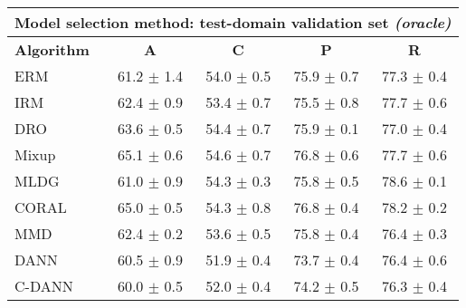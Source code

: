\documentclass{article}
\begin{document}
\begin{center}
\begin{tabular}{lcccc}
\toprule
\multicolumn{5}{c}{\textbf{Model selection method: test-domain validation set \textit{(oracle)}}} \\
\midrule
\textbf{Algorithm}    & \textbf{A}                & \textbf{C}                & \textbf{P}                & \textbf{R}                \\
\midrule
ERM                       & 61.2 $\pm$ 1.4            & 54.0 $\pm$ 0.5            & 75.9 $\pm$ 0.7            & 77.3 $\pm$ 0.4            \\
IRM                       & 62.4 $\pm$ 0.9            & 53.4 $\pm$ 0.7            & 75.5 $\pm$ 0.8            & 77.7 $\pm$ 0.6            \\
DRO                 & 63.6 $\pm$ 0.5            & 54.4 $\pm$ 0.7            & 75.9 $\pm$ 0.1            & 77.0 $\pm$ 0.4            \\
Mixup                     & 65.1 $\pm$ 0.6            & 54.6 $\pm$ 0.7            & 76.8 $\pm$ 0.6            & 77.7 $\pm$ 0.6            \\
MLDG                      & 61.0 $\pm$ 0.9            & 54.3 $\pm$ 0.3            & 75.8 $\pm$ 0.5            & 78.6 $\pm$ 0.1            \\
CORAL                     & 65.0 $\pm$ 0.5            & 54.3 $\pm$ 0.8            & 76.8 $\pm$ 0.4            & 78.2 $\pm$ 0.2            \\
MMD                       & 62.4 $\pm$ 0.2            & 53.6 $\pm$ 0.5            & 75.8 $\pm$ 0.4            & 76.4 $\pm$ 0.3            \\
DANN                       & 60.5 $\pm$ 0.9            & 51.9 $\pm$ 0.4            & 73.7 $\pm$ 0.4            & 76.4 $\pm$ 0.6            \\
C-DANN                   & 60.0 $\pm$ 0.5            & 52.0 $\pm$ 0.4            & 74.2 $\pm$ 0.5            & 76.3 $\pm$ 0.4            \\
\bottomrule
\end{tabular}
\end{center}

\clearpage
\newpage
\end{document}
